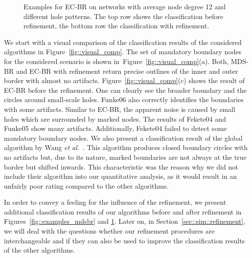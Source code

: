 \documentclass{llncs}
\begin{document}
\begin{figure}[p]
\centering
\hfill
{}
\hfill
{}
\hfill
{}
\hfill
{}
\hfill
{}
\hfill{}

\hfill
{}
\hfill
{}
\hfill
{}
\hfill
{}
\hfill
{}
\hfill{}
\caption{Examples for EC-BR on networks with average node degree 12 and different hole patterns. 
The top row shows the classification before refinement, the bottom row the classification with refinement.}
\label{fig::examples_ecbr}
\end{figure}


We start with a visual comparison of the classification results of the considered algorithms in Figure~\ref{fig::visual_comp}.
The set of mandatory boundary nodes for the considered scenario is shown in~Figure~\ref{fig::visual_comp}(a).
Both, MDS-BR and EC-BR with refinement return precise outlines of the inner and outer border with almost no artifacts.
Figure~\ref{fig::visual_comp}(c) shows the result of EC-BR before the refinement.
One can clearly see the broader boundary and the circles around small-scale holes.
Funke06 also correctly identifies the boundaries with some artifacts.
Similar to EC-BR, the apparent noise is caused by small holes which are surrounded by marked nodes.
The results of Fekete04 and Funke05 show many artifacts.
Additionally, Fekete04 failed to detect some mandatory boundary nodes.
We also present a classification result of the global algorithm by Wang \emph{et al.}~\cite{wgm06}.
This algorithm produces closed boundary circles with no artifacts but, due to its nature, marked boundaries are not always at the true border but shifted inwards.
This characteristic was the reason why we did not include their algorithm into our quantitative analysis, as it would result in an unfairly poor rating compared to the other algorithms.

In order to convey a feeling for the influence of the refinement, we present additional classification results of our algorithms before and after refinement in Figures~\ref{fig::examples_mdsbr} and \ref{fig::examples_ecbr}. Later on, in Section~\ref{sec::sim::refinement}, we will deal with the questions whether our refinement procedures are interchangeable and if they can also be used to improve the classification results of the other algorithms.
\end{document}
